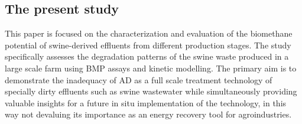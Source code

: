 \subsection{The present study}
This paper is focused on the characterization and evaluation of the biomethane potential of swine-derived effluents from different production stages. The study specifically assesses the degradation patterns of the swine waste produced in a large scale farm using BMP assays and kinetic modelling. The primary aim is to demonstrate the inadequacy of AD as a full scale treatment technology of specially dirty effluents such as swine wastewater while simultaneously providing valuable insights for a future in situ implementation of the technology, in this way not devaluing its importance as an energy recovery tool for agroindustries.